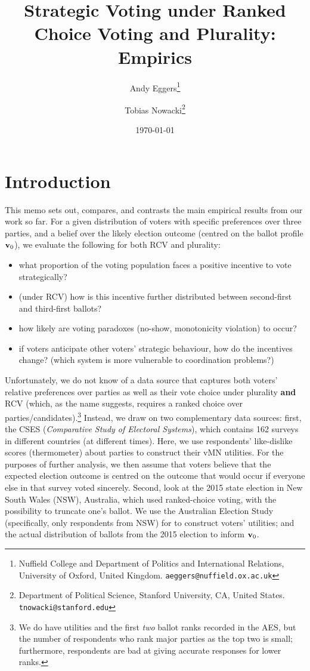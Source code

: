 \documentclass[11pt, letter, margin = 2 in]{article}
\begin{document}
\author{Andy Eggers\thanks{Nuffield College and Department of Politics and International Relations, University of Oxford, United Kingdom. \texttt{aeggers@nuffield.ox.ac.uk}}
\and
Tobias Nowacki\thanks{Department of Political Science, Stanford University, CA, United States. \texttt{tnowacki@stanford.edu}}}
\date{\today}
\title{Strategic Voting under Ranked Choice Voting and Plurality: Empirics}

\maketitle

\section{Introduction}

This memo sets out, compares, and contrasts the main empirical results from our work so far. For a given distribution of voters with specific preferences over three parties, and a belief over the likely election outcome (centred on the ballot profile ${\bf v}_0$), we evaluate the following for both RCV and plurality:
\begin{itemize}
\item what proportion of the voting population faces a positive incentive to vote strategically?
\item (under RCV) how is this incentive further distributed between second-first and third-first ballots?
\item how likely are voting paradoxes (no-show, monotonicity violation) to occur?
\item if voters anticipate other voters' strategic behaviour, how do the incentives change? (which system is more vulnerable to coordination problems?)
\end{itemize}

Unfortunately, we do not know of a data source that captures both voters' relative preferences over parties as well as their vote choice under plurality \textbf{and} RCV (which, as the name suggests, requires a ranked choice over parties/candidates).\footnote{We do have utilities and the first \textit{two} ballot ranks recorded in the AES, but the number of respondents who rank major parties as the top two is small; furthermore, respondents are bad at giving accurate responses for lower ranks.} Instead, we draw on two complementary data sources: first, the CSES (\textit{Comparative Study of Electoral Systems}), which contains 162 surveys in different countries (at different times). Here, we use respondents' like-dislike scores (thermometer) about parties to construct their vMN utilities. For the purposes of further analysis, we then assume that voters believe that the expected election outcome is centred on the outcome that would occur if everyone else in that survey voted sincerely. Second, look at the 2015 state election in New South Wales (NSW), Australia, which used ranked-choice voting, with the possibility to truncate one's ballot. We use the Australian Election Study (specifically, only respondents from NSW) for to construct voters' utilities; and the actual distribution of ballots from the 2015 election to inform ${\bf v}_0$.
\end{document}
